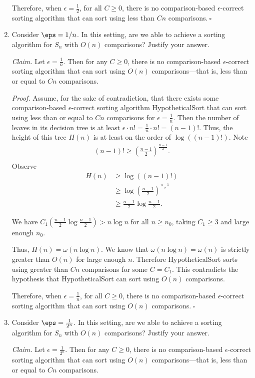 \begin{enumerate}[resume]
\begin{solution}
Therefore, when $\epsilon=\frac{1}{2}$, for all $C\geq 0$, there is no comparison-based $\epsilon$-correct sorting algorithm that can sort using less than $Cn$ comparisons.$~\square$
\end{solution}
\newpage
    \item Consider $\eps=1/n$. In this setting, are we able to achieve a sorting algorithm for $S_n$ with $O(n)$ comparisons? Justify your answer.
\begin{solution}
\textit{Claim. }Let $\epsilon=\frac{1}{n}$. Then for any $C\geq 0$, there is no comparison-based $\epsilon$-correct sorting algorithm that can sort using $O(n)$ comparisons---that is, less than or equal to $Cn$ comparisons.

\textit{Proof. }Assume, for the sake of contradiction, that there exists some comparison-based $\epsilon$-correct sorting algorithm {\sc HypotheticalSort} that can sort using less than or equal to $Cn$ comparisons for $\epsilon=\frac{1}{n}$. Then the number of leaves in its decision tree is at least $\epsilon\cdot n!=\frac{1}{n}\cdot n!=(n-1)!$. Thus, the height of this tree $H(n)$ is at least on the order of $\log((n-1)!)$. Note
\begin{align*}
(n-1)!\geq\left(\frac{n-1}{2}\right)^{\frac{n-1}{2}}.\\
\end{align*}
Observe
\begin{align*}
H(n)&\geq\log((n-1)!)\\
&\geq\log\left(\frac{n-1}{2}\right)^{\frac{n-1}{2}}\\
&\geq\frac{n-1}{2}\log\frac{n-1}{2}.
\end{align*}

We have $C_1\left(\frac{n-1}{2}\log\frac{n-1}{2}\right)>n\log n$ for all $n\geq n_0$, taking $C_1\geq 3$ and large enough $n_0$.

Thus, $H(n)=\omega(n\log n)$. We know that $\omega(n\log n)=\omega(n)$ is strictly greater than $O(n)$ for large enough $n$. Therefore {\sc HypotheticalSort} sorts using greater than $Cn$ comparisons for some $C=C_1$. This contradicts the hypothesis that {\sc HypotheticalSort} can sort using $O(n)$ comparisons.

Therefore, when $\epsilon=\frac{1}{n}$, for all $C\geq 0$, there is no comparison-based $\epsilon$-correct sorting algorithm that can sort using $O(n)$ comparisons.$~\square$
\end{solution}
\newpage
    \item Consider $\eps=\frac{1}{2^n}$. In this setting, are we able to achieve a sorting algorithm for $S_n$ with $O(n)$ comparisons? Justify your answer.
\begin{solution}
\textit{Claim. }Let $\epsilon=\frac{1}{2^n}$. Then for any $C\geq 0$, there is no comparison-based $\epsilon$-correct sorting algorithm that can sort using $O(n)$ comparisons---that is, less than or equal to $Cn$ comparisons.


\end{solution}
\end{enumerate}
